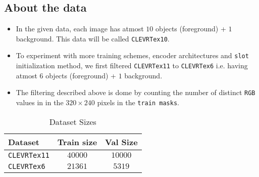 \subsection{About the data}
\begin{itemize}
    \item In the given data, each image has atmost $10$ objects (foreground) + $1$ background. This data will be called 
    \verb|CLEVRTex10|. 
    \item To experiment with more training schemes, encoder architectures and \verb|slot| initialization method, we first filtered \verb|CLEVRTex11| to \verb|CLEVRTex6| i.e. having atmost $6$ objects (foreground) + $1$ background.
    \item The filtering described above is dome by counting the number of distinct \verb|RGB| values in in the $320 \times 240$ pixels in the \verb|train masks|.
\end{itemize}

\begin{table}[htbp]
    \centering
    \caption{Dataset Sizes}
    \label{tab:dataset_sizes}
    \begin{tabular}{lcc}
        \toprule
        Dataset & Train size & Val Size \\
        \midrule
        \verb|CLEVRTex11| & $40000$ & $10000$ \\
        \verb|CLEVRTex6| & $21361$ & $5319$ \\
        \bottomrule
    \end{tabular}
\end{table}


